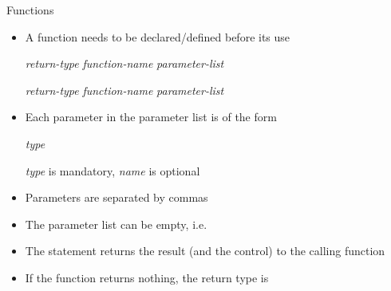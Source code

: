 \begin{frame}{Functions \insertcontinuationtext}

  \begin{itemize}
  \item<1-> A function needs to be declared/defined before its use

    \textit{return-type} \textit{function-name} \code{(} \textit{parameter-list} \code{);}

    \textit{return-type} \textit{function-name} \code{(} \textit{parameter-list} \code{) \{ \ddd \}}


  \item<3-> Each parameter in the parameter list is of the form

    \textit{type }

    \textit{type} is mandatory, \textit{name} is optional

  \item<4-> Parameters are separated by commas

  \item<5-> The parameter list can be empty, i.e. \code{()}

  \item<6-> The  statement returns the result (and the control) to
    the calling function

  \item<7-> If the function returns nothing, the return type is 
  \end{itemize}

\end{frame}

